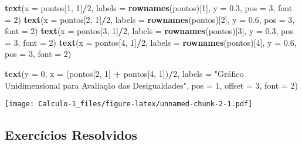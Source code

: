 \documentclass[]{book}
\newenvironment{Shaded}{\begin{snugshade}}{\end{snugshade}}
\newcommand{\KeywordTok}[1]{\textcolor[rgb]{0.13,0.29,0.53}{\textbf{#1}}}
\newcommand{\DataTypeTok}[1]{\textcolor[rgb]{0.13,0.29,0.53}{#1}}
\newcommand{\DecValTok}[1]{\textcolor[rgb]{0.00,0.00,0.81}{#1}}
\newcommand{\FloatTok}[1]{\textcolor[rgb]{0.00,0.00,0.81}{#1}}
\newcommand{\StringTok}[1]{\textcolor[rgb]{0.31,0.60,0.02}{#1}}
\newcommand{\OperatorTok}[1]{\textcolor[rgb]{0.81,0.36,0.00}{\textbf{#1}}}
\newcommand{\NormalTok}[1]{#1}
\begin{document}
\begin{Shaded}
\begin{Highlighting}[]
\KeywordTok{text}\NormalTok{(}\DataTypeTok{x =}\NormalTok{ pontos[}\DecValTok{1}\NormalTok{, }\DecValTok{1}\NormalTok{]}\OperatorTok{/}\DecValTok{2}\NormalTok{, }\DataTypeTok{labels =} \KeywordTok{rownames}\NormalTok{(pontos)[}\DecValTok{1}\NormalTok{], }\DataTypeTok{y =} \FloatTok{0.3}\NormalTok{,}
     \DataTypeTok{pos =} \DecValTok{3}\NormalTok{, }\DataTypeTok{font =} \DecValTok{2}\NormalTok{)}
\KeywordTok{text}\NormalTok{(}\DataTypeTok{x =}\NormalTok{ pontos[}\DecValTok{2}\NormalTok{, }\DecValTok{1}\NormalTok{]}\OperatorTok{/}\DecValTok{2}\NormalTok{, }\DataTypeTok{labels =} \KeywordTok{rownames}\NormalTok{(pontos)[}\DecValTok{2}\NormalTok{], }\DataTypeTok{y =} \FloatTok{0.6}\NormalTok{,}
     \DataTypeTok{pos =} \DecValTok{3}\NormalTok{, }\DataTypeTok{font =} \DecValTok{2}\NormalTok{)}
\KeywordTok{text}\NormalTok{(}\DataTypeTok{x =}\NormalTok{ pontos[}\DecValTok{3}\NormalTok{, }\DecValTok{1}\NormalTok{]}\OperatorTok{/}\DecValTok{2}\NormalTok{, }\DataTypeTok{labels =} \KeywordTok{rownames}\NormalTok{(pontos)[}\DecValTok{3}\NormalTok{], }\DataTypeTok{y =} \FloatTok{0.3}\NormalTok{,}
     \DataTypeTok{pos =} \DecValTok{3}\NormalTok{, }\DataTypeTok{font =} \DecValTok{2}\NormalTok{)}
\KeywordTok{text}\NormalTok{(}\DataTypeTok{x =}\NormalTok{ pontos[}\DecValTok{4}\NormalTok{, }\DecValTok{1}\NormalTok{]}\OperatorTok{/}\DecValTok{2}\NormalTok{, }\DataTypeTok{labels =} \KeywordTok{rownames}\NormalTok{(pontos)[}\DecValTok{4}\NormalTok{], }\DataTypeTok{y =} \FloatTok{0.6}\NormalTok{,}
     \DataTypeTok{pos =} \DecValTok{3}\NormalTok{, }\DataTypeTok{font =} \DecValTok{2}\NormalTok{)}

\KeywordTok{text}\NormalTok{(}\DataTypeTok{y =} \DecValTok{0}\NormalTok{, }\DataTypeTok{x =}\NormalTok{ (pontos[}\DecValTok{2}\NormalTok{, }\DecValTok{1}\NormalTok{] }\OperatorTok{+}\StringTok{ }\NormalTok{pontos[}\DecValTok{4}\NormalTok{, }\DecValTok{1}\NormalTok{])}\OperatorTok{/}\DecValTok{2}\NormalTok{,}
     \DataTypeTok{labels =} \StringTok{"Gráfico Unidimensional para Avaliação das Desigualdades"}\NormalTok{,}
     \DataTypeTok{pos =} \DecValTok{1}\NormalTok{, }\DataTypeTok{offset =} \DecValTok{3}\NormalTok{, }\DataTypeTok{font =} \DecValTok{2}\NormalTok{)}
\end{Highlighting}
\end{Shaded}

\texttt{[image: Calculo-1\_files/figure-latex/unnamed-chunk-2-1.pdf]}

\subsection{Exercícios Resolvidos}\label{exercicios-resolvidos}
\end{document}
